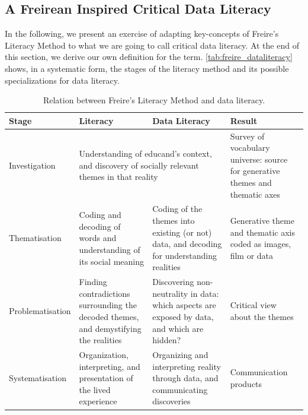 \subsection{A Freirean Inspired Critical Data Literacy}
\label{sec:freirean_dl}
In the following, we present an exercise of adapting key-concepts of Freire's Literacy Method to what we are going to call critical data literacy. At the end of this section, we derive our own definition for the term. \autoref{tab:freire_dataliteracy} shows, in a systematic form, the stages of the literacy method and its possible specializations for data literacy.

\begin{table}[h]
\ABNTEXfontereduzida
\centering
\caption{Relation between Freire's Literacy Method and data literacy.}
\label{tab:freire_dataliteracy}
\begin{tabular}{|p{2.5cm}|p{3.6cm}|p{3.6cm}|p{3.6cm}|}
\hline
\textbf{Stage}   & \textbf{Literacy} & \textbf{Data Literacy} & \textbf{Result} \\ \hline
Investigation&
\multicolumn{2}{p{7.2cm}|}{Understanding of educand's context, and discovery of socially relevant themes in that reality}
&Survey of vocabulary universe: source for generative themes and thematic axes \\ \hline

Thematisation&Coding and decoding of words and understanding of its social meaning&Coding of the themes into existing (or not) data, and decoding for understanding realities&Generative theme and thematic axis coded as images, film or data \\ \hline

Problematisation&Finding contradictions surrounding the decoded themes, and demystifying the realities&Discovering non-neutrality in data: which aspects are exposed by data, and which are hidden?&Critical view about the themes \\ \hline

Systematisation&Organization, interpreting, and presentation of the lived experience&Organizing and interpreting reality through data, and communicating discoveries&Communication products \\ \hline

\end{tabular}
\end{table}

